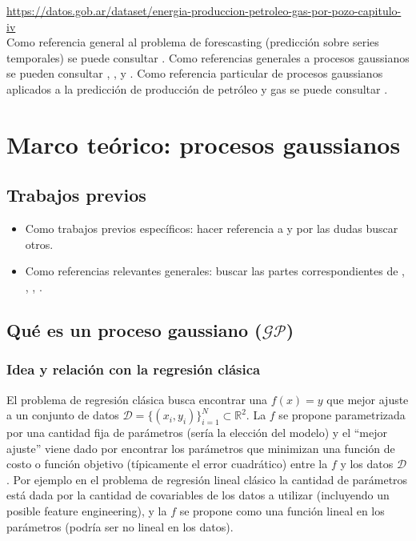 \documentclass[a4paper]{article}
\newcommand{\gp}{\ensuremath{\mathcal{GP}}}
\begin{document}
\url{https://datos.gob.ar/dataset/energia-produccion-petroleo-gas-por-pozo-capitulo-iv}\\

Como referencia general al problema de forescasting (predicción sobre series temporales) se puede consultar \cite{hyndman}. Como referencias generales a procesos gaussianos se pueden consultar \cite{gramacy}, \cite{tobar}, \cite{rasmussen} y \cite{murphy}. Como referencia particular de procesos gaussianos aplicados a la predicción de producción de petróleo y gas se puede consultar \cite{gppaper1}.




\section{Marco teórico: procesos gaussianos}

\subsection{Trabajos previos}

\begin{itemize}
	\item Como trabajos previos específicos: hacer referencia a \cite{gppaper1} y por las dudas buscar otros.
	\item Como referencias relevantes generales: buscar las partes correspondientes de \cite{gramacy}, \cite{rasmussen}, \cite{murphy}, \cite{tobar}.
\end{itemize}


\subsection{Qué es un proceso gaussiano ($\gp$)}
\label{subsec:introGP}

\subsubsection{Idea y relación con la regresión clásica}
\label{subsubsec:ideagp}
El problema de regresión clásica busca encontrar una $f(x)=y$ que mejor ajuste a un conjunto de datos $\mathcal{D}=\{(x_i, y_i)\}_{i=1}^N \subset \mathbb{R}^2$. La $f$ se propone parametrizada por una cantidad fija de parámetros (sería la elección del modelo) y el ``mejor ajuste'' viene dado por encontrar los parámetros que minimizan una función de costo o función objetivo (típicamente el error cuadrático) entre la $f$ y los datos $\mathcal{D}$. Por ejemplo en el problema de regresión lineal clásico la cantidad de parámetros está dada por la cantidad de covariables de los datos a utilizar (incluyendo un posible feature engineering), y la $f$ se propone como una función lineal en los parámetros (podría ser no lineal en los datos).
\end{document}
